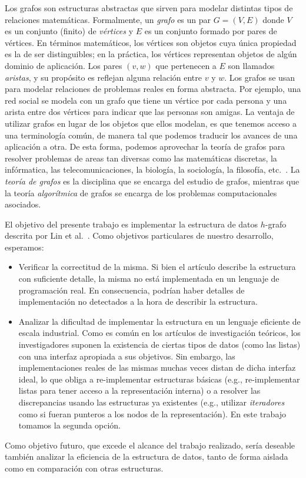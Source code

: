 \documentclass[%
    a4paper,%
    12pt,%
    twoside,%
    openright,%
    halfparskip,%
    cleardoubleempty,%
    bigheadings,%
    titlepage,%
    headsepline%
]{scrbook}
\begin{document}
Los grafos son estructuras abstractas que sirven para modelar distintas tipos de relaciones matemáticas.  Formalmente, un \emph{grafo} es un par $G = (V, E)$ donde $V$ es un conjunto (finito) de \emph{vértices} y $E$ es un conjunto formado por pares de vértices.  En términos matemáticos, los vértices son objetos cuya única propiedad es la de ser distinguibles; en la práctica, los vértices representan objetos de algún dominio de aplicación.  Los pares $(v,w)$ que pertenecen a $E$ son llamados \emph{aristas}, y su propósito es reflejan alguna relación entre $v$ y $w$.  Los grafos se usan para modelar relaciones de problemas reales en forma abstracta.  Por ejemplo, una red social se modela con un grafo que tiene un vértice por cada persona y una arista entre dos vértices para indicar que las personas son amigas.  La ventaja de utilizar grafos en lugar de los objetos que ellos modelan, es que tenemos acceso a una terminología común, de manera tal que podemos traducir los avances de una aplicación a otra.  De esta forma, podemos aprovechar la teoría de grafos para resolver problemas de areas tan diversas como las matemáticas discretas, la infórmatica, las telecomunicaciones, la biología, la sociología, la filosofía, etc.~\cite{GrossYellen2006}.  La \emph{teoría de grafos} es la disciplina que se encarga del estudio de grafos, mientras que la teoría \emph{algorítmica} de grafos se encarga de los problemas computacionales asociados.

El objetivo del presente trabajo es implementar la estructura de datos $h$-grafo descrita por Lin et al.~\cite{LinSoulignacSzwarcfiterTCS2012}.   Como objetivos particulares de nuestro desarrollo, esperamos:
\begin{itemize}
  \item Verificar la correctitud de la misma.  Si bien el artículo describe la estructura con suficiente detalle, la misma no está implementada en un lenguaje de programación real.  En consecuencia, podrían haber detalles de implementación no detectados a la hora de describir la estructura.
  \item Analizar la dificultad de implementar la estructura en un lenguaje eficiente de escala industrial.  Como es común en los artículos de investigación teóricos, los investigadores suponen la existencia de ciertas tipos de datos (como las listas) con una interfaz apropiada a sus objetivos.  Sin embargo, las implementaciones reales de las mismas muchas veces distan de dicha interfaz ideal, lo que obliga a re-implementar estructuras básicas (e.g., re-implementar listas para tener acceso a la representación interna) o a resolver las discrepancias usando las estructuras ya existentes (e.g., utilizar \emph{iteradores} como si fueran punteros a los nodos de la representación).  En este trabajo tomamos la segunda opción.
\end{itemize}
Como objetivo futuro, que excede el alcance del trabajo realizado, sería deseable también analizar la eficiencia de la estructura de datos, tanto de forma aislada como en comparación con otras estructuras.
\end{document}
